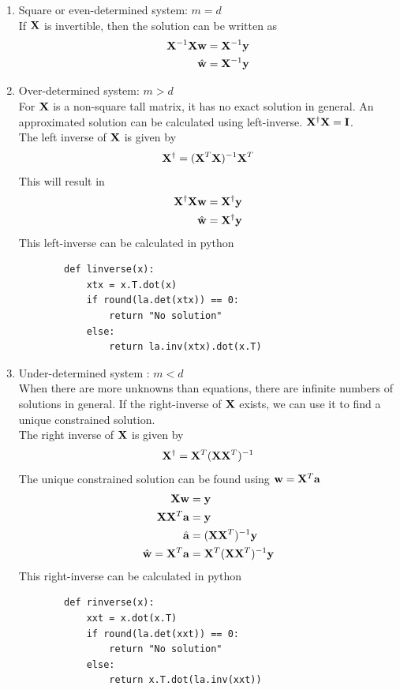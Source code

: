 \begin{enumerate}
\begin{table}[ht]
    \end{table}
    \item Square or even-determined system: $m=d$ \\
    If $\mathbf{X}$ is invertible, then the solution can be written as 
    \begin{align*}
        \mathbf{X}^{-1}\mathbf{X}\mathbf{w} &= \mathbf{X}^{-1}\mathbf{y} \\
        \hat{\mathbf{w}} &= \mathbf{X}^{-1}\mathbf{y}
    \end{align*}
    \item Over-determined system: $m>d$ \\
    For $\mathbf{X}$ is a non-square tall matrix, it has no exact solution in general. An approximated solution can be calculated using left-inverse. $\mathbf{X}^{\dagger}\mathbf{X} = \mathbf{I}$. \\
    The left inverse of $\mathbf{X}$ is given by 
    \[\mathbf{X}^{\dagger} = (\mathbf{X}^T\mathbf{X})^{-1}\mathbf{X}^T\]
    This will result in
    \begin{align*}
        \mathbf{X}^{\dagger}\mathbf{X}\mathbf{w} &= \mathbf{X}^{\dagger}\mathbf{y} \\
        \hat{\mathbf{w}} &= \mathbf{X}^{\dagger}\mathbf{y}
    \end{align*}
    This left-inverse can be calculated in python 
    \begin{verbatim}
        def linverse(x):
            xtx = x.T.dot(x)
            if round(la.det(xtx)) == 0:
                return "No solution"
            else:
                return la.inv(xtx).dot(x.T)
    \end{verbatim}
    \item Under-determined system : $m<d$ \\
    When there are more unknowns than equations, there are infinite numbers of solutions in general. If the right-inverse of $\mathbf{X}$ exists, we can use it to find a unique constrained solution.\\
    The right inverse of $\mathbf{X}$ is given by
    \[\mathbf{X}^{\dagger}=\mathbf{X}^T(\mathbf{X}\mathbf{X}^T)^{-1}\]
    The unique constrained solution can be found using $\mathbf{w} = \mathbf{X}^T\mathbf{a}$
    \begin{align*}
        \mathbf{X}\mathbf{w} &= \mathbf{y} \\
        \mathbf{X}\mathbf{X}^T\mathbf{a} &= \mathbf{y} \\
        \hat{\mathbf{a}} & = (\mathbf{X}\mathbf{X}^T)^{-1}\mathbf{y}\\
        \hat{\mathbf{w}} = \mathbf{X}^T\mathbf{a} & = \mathbf{X}^T (\mathbf{X}\mathbf{X}^T)^{-1}\mathbf{y}
    \end{align*}
    This right-inverse can be calculated in python
    \begin{verbatim}
        def rinverse(x):
            xxt = x.dot(x.T)
            if round(la.det(xxt)) == 0:
                return "No solution"
            else:
                return x.T.dot(la.inv(xxt))
    \end{verbatim}
\end{enumerate}
